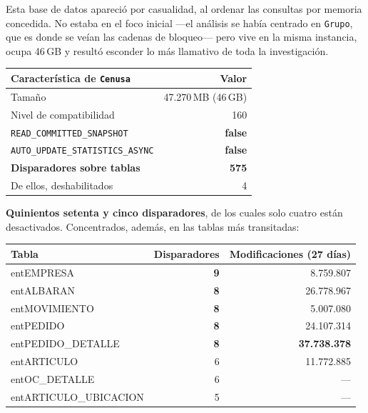 \documentclass[11pt,a4paper]{article}
\newcommand{\cod}[1]{\texttt{\small #1}}
\newcommand{\critico}[1]{\textcolor{rojo}{\textbf{#1}}}
\begin{document}
Esta base de datos apareció por casualidad, al ordenar las consultas por
memoria concedida. No estaba en el foco inicial —el análisis se había
centrado en \cod{Grupo}, que es donde se veían las cadenas de bloqueo— pero
vive en la misma instancia, ocupa 46\,GB y resultó esconder lo más llamativo
de toda la investigación.

\begin{table}[h]
\centering
\small
\begin{tabular}{lr}
\toprule
\textbf{Característica de \cod{Cenusa}} & \textbf{Valor} \\
\midrule
Tamaño                              & 47.270\,MB (46\,GB) \\
Nivel de compatibilidad             & 160 \\
\cod{READ\_COMMITTED\_SNAPSHOT}     & \critico{false} \\
\cod{AUTO\_UPDATE\_STATISTICS\_ASYNC} & \critico{false} \\
\textbf{Disparadores sobre tablas}  & \critico{575} \\
De ellos, deshabilitados            & 4 \\
\bottomrule
\end{tabular}
\end{table}

\textbf{Quinientos setenta y cinco disparadores}, de los cuales solo cuatro
están desactivados. Concentrados, además, en las tablas más transitadas:

\begin{table}[h]
\centering
\small
\begin{tabular}{lrr}
\toprule
\textbf{Tabla} & \textbf{Disparadores} & \textbf{Modificaciones (27 días)} \\
\midrule
entEMPRESA           & \critico{9} &  8.759.807 \\
entALBARAN           & \critico{8} & 26.778.967 \\
entMOVIMIENTO        & \critico{8} &  5.007.080 \\
entPEDIDO            & \critico{8} & 24.107.314 \\
entPEDIDO\_DETALLE   & \critico{8} & \critico{37.738.378} \\
entARTICULO          & 6 & 11.772.885 \\
entOC\_DETALLE       & 6 & --- \\
entARTICULO\_UBICACION & 5 & --- \\
\bottomrule
\end{tabular}
\end{table}
\end{document}
